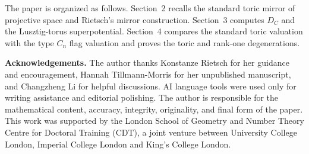 The paper is organized as follows. Section~2 recalls the standard toric mirror of projective space and Rietsch's mirror construction. Section~3 computes \(D_C\) and the Lusztig-torus superpotential. Section~4 compares the standard toric valuation with the type \(C_n\) flag valuation and proves the toric and rank-one degenerations.

{\small\noindent\textbf{Acknowledgements.} The author thanks Konstanze Rietsch for her guidance and encouragement, Hannah Tillmann-Morris for her unpublished manuscript, and Changzheng Li for helpful discussions. AI language tools were used only for writing assistance and editorial polishing. The author is responsible for the mathematical content, accuracy, integrity, originality, and final form of the paper. This work was supported by the London School of Geometry and Number Theory Centre for Doctoral Training (CDT), a joint venture between University College London, Imperial College London and King's College London.}
